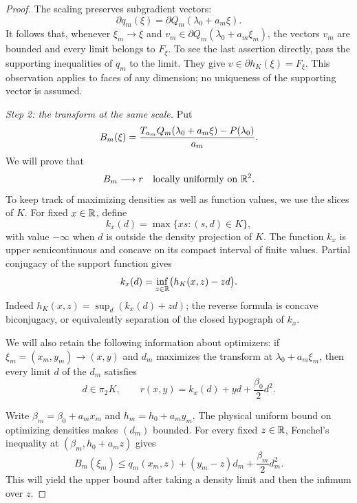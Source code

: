 \begin{proof}
The scaling preserves subgradient vectors:
\[
 \partial q_m(\xi)
   =\partial Q_m(\lambda_0+a_m\xi).
\]
It follows that, whenever $\xi_m\to\xi$ and
$v_m\in\partial Q_m(\lambda_0+a_m\xi_m)$, the vectors $v_m$ are bounded
and every limit belongs to $F_\xi$. To see the last assertion directly,
pass the supporting inequalities of $q_m$ to the limit. They give
$v\in\partial h_K(\xi)=F_\xi$. This observation applies to faces of any
dimension; no uniqueness of the supporting vector is assumed.

\smallskip
\noindent\textit{Step 2: the transform at the same scale.}
Put
\[
 B_m(\xi)=
 \frac{T_{a_m}Q_m(\lambda_0+a_m\xi)-P(\lambda_0)}{a_m}.
\]
We will prove that
\begin{equation}
 B_m\longrightarrow r
 \quad\text{locally uniformly on }\mathbb R^2.
 \label{eq:scaled-transform-limit}
\end{equation}
To keep track of maximizing densities as well as function values, we use the slices of $K$.
For fixed $x\in\mathbb R$, define
\[
 k_x(d)=\max\{xs:(s,d)\in K\},
\]
with value $-\infty$ when $d$ is outside the density projection of $K$.
The function $k_x$ is upper semicontinuous and concave on its compact
interval of finite values. Partial conjugacy of the support function gives
\begin{equation}
 k_x(d)=\inf_{z\in\mathbb R}\bigl(h_K(x,z)-zd\bigr).
 \label{eq:slice-conjugacy}
\end{equation}
Indeed $h_K(x,z)=\sup_d(k_x(d)+zd)$; the reverse formula is concave
biconjugacy, or equivalently separation of the closed hypograph of $k_x$.

We will also retain the following information about optimizers: if
$\xi_m=(x_m,y_m)\to(x,y)$ and $d_m$ maximizes the transform at
$\lambda_0+a_m\xi_m$, then every limit $d$ of the $d_m$ satisfies
\begin{equation}
 d\in\pi_2K,
 \qquad
 r(x,y)=k_x(d)+yd+\frac{\beta_0}{2}d^2.
 \label{eq:scaled-optimizer}
\end{equation}

Write $\beta_m=\beta_0+a_mx_m$ and $h_m=h_0+a_my_m$.
The physical uniform bound on optimizing densities makes $(d_m)$
bounded. For every fixed $z\in\mathbb R$, Fenchel's inequality at
$(\beta_m,h_0+a_mz)$ gives
\begin{equation}
 B_m(\xi_m)\leq q_m(x_m,z)+(y_m-z)d_m
                     +\frac{\beta_m}{2}d_m^2.
 \label{eq:scaled-upper}
\end{equation}
This will yield the upper bound after taking a density limit and then
the infimum over $z$.


\end{proof}
